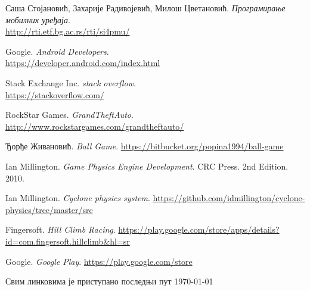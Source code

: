
\begin{thebibliography}{refs}

		Саша Стојановић, Захарије Радивојевић, Милош Цветановић.
		\emph{Програмирање мобилних уређаја}.\\
		\url{http://rti.etf.bg.ac.rs/rti/si4pmu/}


		Google.
		\emph{Android Developers}.\\
		\url{https://developer.android.com/index.html}


		Stack Exchange Inc.
		\emph{stack overflow}.\\
		\url{https://stackoverflow.com/}

		RockStar Games.
		\emph{GrandTheftAuto}.
		\url{http://www.rockstargames.com/grandtheftauto/}
		
		Ђорђе Живановић.
		\emph{Ball Game}.
		\url{https://bitbucket.org/popina1994/ball-game}		
		
		Ian Millington.
		\emph{Game Physics Engine Development}.
		CRC Press.
		2nd Edition. 2010.




		Ian Millington.
		\emph{Cyclone physics system}.
		\url{https://github.com/idmillington/cyclone-physics/tree/master/src}

		Fingersoft.
		\emph{Hill Climb Racing}.
		\url{https://play.google.com/store/apps/details?id=com.fingersoft.hillclimb&hl=sr}

		Google.
		\emph{Google Play}.
		\url{https://play.google.com/store}






\end{thebibliography}

Свим линковима је приступано последњи пут \today
